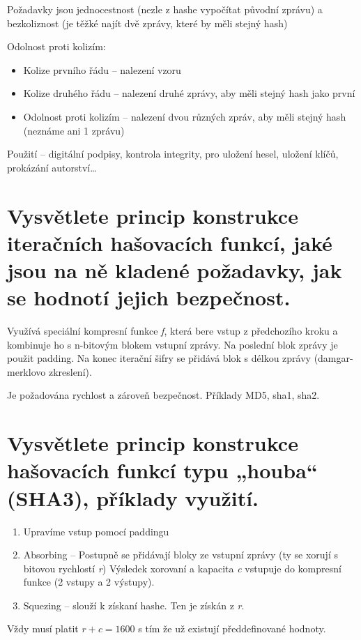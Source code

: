 Požadavky jsou jednocestnost (nezle z hashe vypočítat původní zprávu) a bezkoliznost (je těžké najít dvě zprávy, které by měli stejný hash)

Odolnost proti kolizím:
\begin{itemize}
    \item Kolize prvního řádu -- nalezení vzoru
    \item Kolize druhého řádu -- nalezení druhé zprávy, aby měli stejný hash jako první
    \item Odolnost proti kolizím -- nalezení dvou různých zpráv, aby měli stejný hash (neznáme ani 1 zprávu)
\end{itemize}

Použití -- digitální podpisy, kontrola integrity, pro uložení hesel, uložení klíčů, prokázání autorství\dots

\section{Vysvětlete princip konstrukce iteračních hašovacích funkcí, jaké jsou na ně kladené požadavky, jak se hodnotí jejich bezpečnost.}

Využívá speciální kompresní funkce \textit{f}, která bere vstup z předchozího kroku a kombinuje ho s n-bitovým blokem vstupní zprávy. Na poslední blok zprávy je použit padding. Na konec iterační šifry se přidává blok s délkou zprávy (damgar-merklovo zkreslení).

Je požadována rychlost a zároveň bezpečnost. Příklady MD5, sha1, sha2.

\section{Vysvětlete princip konstrukce hašovacích funkcí typu „houba“ (SHA3), příklady využití.}

\begin{enumerate}
    \item Upravíme vstup pomocí paddingu
    \item Absorbing -- Postupně se přidávají bloky ze vstupní zprávy (ty se xorují s bitovou rychlostí \textit{r}) Výsledek xorovaní a kapacita \textit{c} vstupuje do kompresní funkce (2 vstupy a 2 výstupy).
    \item Squezing -- slouží k získaní hashe. Ten je získán z \textit{r}.
\end{enumerate}

Vždy musí platit $r+c=1600$ s tím že už existují předdefinované hodnoty.

